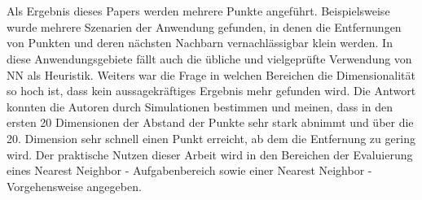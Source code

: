 \documentclass{article}
\begin{document}
\\
\\
Als Ergebnis dieses Papers werden mehrere Punkte angeführt. Beispielsweise wurde mehrere Szenarien der Anwendung gefunden, in denen die Entfernungen von Punkten und deren nächsten Nachbarn vernachlässigbar klein werden. In diese Anwendungsgebiete fällt auch die übliche und vielgeprüfte Verwendung von NN als Heuristik.
Weiters war die Frage in welchen Bereichen die Dimensionalität so hoch ist, dass kein aussagekräftiges Ergebnis mehr gefunden wird. Die Antwort konnten die Autoren durch Simulationen bestimmen und meinen, dass in den ersten 20 Dimensionen der Abstand der Punkte sehr stark abnimmt und über die 20. Dimension sehr schnell einen Punkt erreicht, ab dem die Entfernung zu gering wird.
Der praktische Nutzen dieser Arbeit wird in den Bereichen der Evaluierung eines Nearest Neighbor - Aufgabenbereich sowie einer Nearest Neighbor - Vorgehensweise angegeben.
\end{document}
